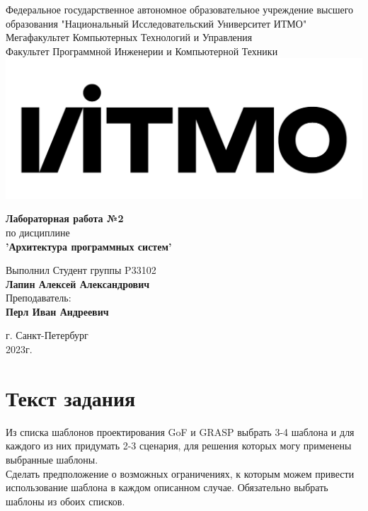 \documentclass[12pt,onecolumn]{article}
\begin{document}
\setcounter{tocdepth}{4}
\begin{center}
    Федеральное государственное автономное образовательное учреждение высшего образования "Национальный Исследовательский Университет ИТМО"\\ 
    Мегафакультет Компьютерных Технологий и Управления\\
    Факультет Программной Инженерии и Компьютерной Техники \\
    \includegraphics[scale=0.3]{image/itmo.jpg} %
\end{center}
\vspace{1cm}


\begin{center}
    \textbf{Лабораторная работа №2}\\
    по дисциплине\\
    \textbf{'Архитектура программных систем'}\\
\end{center}

\vspace{2cm}

\begin{flushright}
  Выполнил Студент  группы P33102\\
  \textbf{Лапин Алексей Александрович}\\
  Преподаватель: \\
  \textbf{Перл Иван Андреевич}\\
\end{flushright}

\vspace{10cm}
\begin{center}
    г. Санкт-Петербург\\
    2023г.
\end{center}
\thispagestyle{empty}
\newpage
\tableofcontents
\newpage
\section{Текст задания}
Из списка шаблонов проектирования GoF и GRASP выбрать 3-4 шаблона и для каждого из них придумать 2-3 сценария, для решения которых могу применены выбранные шаблоны.\\
Сделать предположение о возможных ограничениях, к которым можем привести использование шаблона в каждом описанном случае. Обязательно выбрать шаблоны из обоих списков.\\
\end{document}
